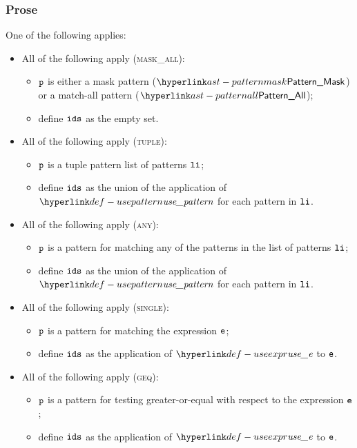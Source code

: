 \subsubsection{Prose}
One of the following applies:
\begin{itemize}
  \item All of the following apply (\textsc{mask\_all}):
  \begin{itemize}
    \item $\texttt{p}$ is either a mask pattern ($\PatternMask$) or a match-all pattern ($\PatternAll$);
    \item define $\texttt{ids}$ as the empty set.
  \end{itemize}

  \item All of the following apply (\textsc{tuple}):
  \begin{itemize}
    \item $\texttt{p}$ is a tuple pattern list of patterns $\texttt{li}$;
    \item define $\texttt{ids}$ as the union of the application of $\usepattern$ for each pattern in $\texttt{li}$.
  \end{itemize}

  \item All of the following apply (\textsc{any}):
  \begin{itemize}
    \item $\texttt{p}$ is a pattern for matching any of the patterns in the list of patterns $\texttt{li}$;
    \item define $\texttt{ids}$ as the union of the application of $\usepattern$ for each pattern in $\texttt{li}$.
  \end{itemize}

  \item All of the following apply (\textsc{single}):
  \begin{itemize}
    \item $\texttt{p}$ is a pattern for matching the expression $\texttt{e}$;
    \item define $\texttt{ids}$ as the application of $\useexpr$ to $\texttt{e}$.
  \end{itemize}

  \item All of the following apply (\textsc{geq}):
  \begin{itemize}
    \item $\texttt{p}$ is a pattern for testing greater-or-equal with respect to the expression $\texttt{e}$;
    \item define $\texttt{ids}$ as the application of $\useexpr$ to $\texttt{e}$.
  \end{itemize}


\end{itemize}
